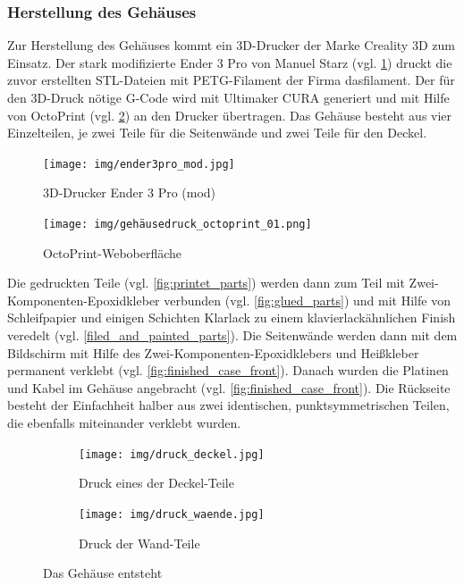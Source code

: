 \subsubsection{Herstellung des Gehäuses}\label{hw_case_herstellung}
Zur Herstellung des Gehäuses kommt ein 3D-Drucker der Marke Creality 3D zum Einsatz. 
Der stark modifizierte Ender 3 Pro von Manuel Starz (vgl. \ref{fig:ender3}) druckt die zuvor erstellten STL-Dateien mit PETG-Filament der Firma dasfilament. 
Der für den 3D-Druck nötige G-Code wird mit Ultimaker CURA generiert und mit Hilfe von OctoPrint (vgl. \ref{fig:octoprint}) an den Drucker übertragen. Das Gehäuse besteht aus vier Einzelteilen, je zwei Teile für die Seitenwände und zwei Teile für den Deckel.\par
\begin{figure}[h!tb]
	\begin{center}
	\texttt{[image: img/ender3pro\_mod.jpg]}
	\end{center}
	\caption[3D-Drucker Ender 3 Pro (mod)]{3D-Drucker Ender 3 Pro (mod)}
	\label{fig:ender3}
\end{figure}
\begin{figure}[h!tb]
	\texttt{[image: img/gehäusedruck\_octoprint\_01.png]}
	\caption[OctoPrint-Weboberfläche]{OctoPrint-Weboberfläche}
	\label{fig:octoprint}
\end{figure}
\noindent Die gedruckten Teile (vgl. \ref{fig:printet_parts}) werden dann zum Teil mit Zwei-Komponenten-Epoxidkleber verbunden (vgl. \ref{fig:glued_parts}) und mit Hilfe von Schleifpapier und einigen Schichten Klarlack zu einem klavierlackähnlichen Finish veredelt (vgl. \ref{filed_and_painted_parts}). 
Die Seitenwände werden dann mit dem Bildschirm mit Hilfe des Zwei-Komponenten-Epoxidklebers und Heißkleber permanent verklebt (vgl. \ref{fig:finished_case_front}).
Danach wurden die Platinen und Kabel im Gehäuse angebracht (vgl. \ref{fig:finished_case_front}). 
Die Rückseite besteht der Einfachheit halber aus zwei identischen, punktsymmetrischen Teilen, die ebenfalls miteinander verklebt wurden.\par
\begin{figure}[h!tb]
	\begin{subfigure}[b]{0.5\linewidth}
		\centering
		\texttt{[image: img/druck\_deckel.jpg]}
		\caption[Druck eines der Deckel-Teile]{Druck eines der Deckel-Teile}
	\end{subfigure}
	\begin{subfigure}[b]{0.5\linewidth}
		\texttt{[image: img/druck\_waende.jpg]}
		\caption[Druck der Wand-Teile]{Druck der Wand-Teile}
	\end{subfigure}
	\caption[Das Gehäuse entsteht]{Das Gehäuse entsteht}
	\label{fig:printing_parts}
\end{figure}
